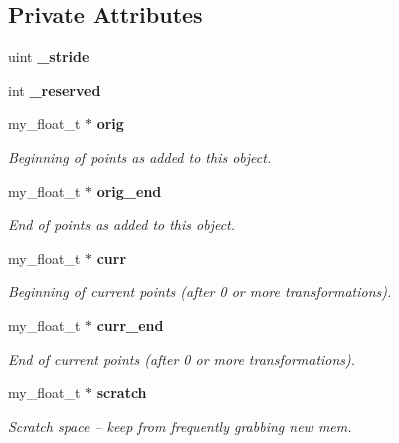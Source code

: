 \subsection*{Private Attributes}
\begin{CompactItemize}
\item 
uint \textbf{\_\-stride}\label{classASCbase_1_1my__float__array_4af7ff17850cdafd9a355127d0f2cca0}

\item 
int \textbf{\_\-reserved}\label{classASCbase_1_1my__float__array_44dc5f56c5c8597129fcc91bf52bd093}

\item 
my\_\-float\_\-t $\ast$ \bf{orig}\label{classASCbase_1_1my__float__array_7bab1066585311c5b0e185761dcafd05}

\begin{CompactList}\small\item\em Beginning of points as added to this object. \item\end{CompactList}\item 
my\_\-float\_\-t $\ast$ \bf{orig\_\-end}\label{classASCbase_1_1my__float__array_22aefb5abe3a4e1ada9cacfb6b5464b3}

\begin{CompactList}\small\item\em End of points as added to this object. \item\end{CompactList}\item 
my\_\-float\_\-t $\ast$ \bf{curr}\label{classASCbase_1_1my__float__array_4dfcdb66fffd9a861988c5343f263ffd}

\begin{CompactList}\small\item\em Beginning of current points (after 0 or more transformations). \item\end{CompactList}\item 
my\_\-float\_\-t $\ast$ \bf{curr\_\-end}\label{classASCbase_1_1my__float__array_38577011f5ee6e411ef96f3a8b8143b2}

\begin{CompactList}\small\item\em End of current points (after 0 or more transformations). \item\end{CompactList}\item 
my\_\-float\_\-t $\ast$ \bf{scratch}\label{classASCbase_1_1my__float__array_4bab597976578f4d790991065b9b417e}

\begin{CompactList}\small\item\em Scratch space -- keep from frequently grabbing new mem. \item\end{CompactList}\end{CompactItemize}



